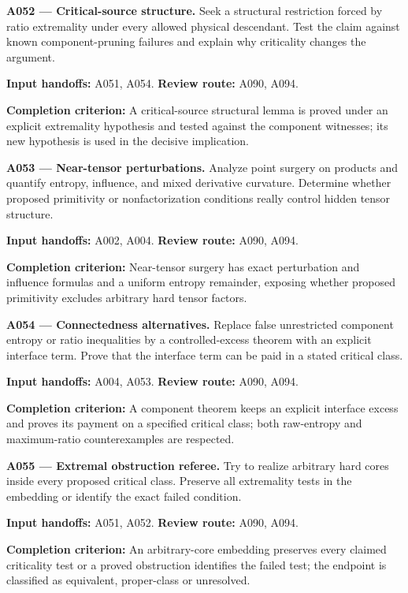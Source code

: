 \documentclass[11pt]{article}
\begin{document}
\textbf{A052 --- Critical-source structure.} Seek a structural restriction forced by ratio extremality under every allowed physical descendant. Test the claim against known component-pruning failures and explain why criticality changes the argument.

{\small\color{ink}\textbf{Input handoffs:} A051, A054. \textbf{Review route:} A090, A094.\par
\textbf{Completion criterion:} A critical-source structural lemma is proved under an explicit extremality hypothesis and tested against the component witnesses; its new hypothesis is used in the decisive implication.\par}



\textbf{A053 --- Near-tensor perturbations.} Analyze point surgery on products and quantify entropy, influence, and mixed derivative curvature. Determine whether proposed primitivity or nonfactorization conditions really control hidden tensor structure.

{\small\color{ink}\textbf{Input handoffs:} A002, A004. \textbf{Review route:} A090, A094.\par
\textbf{Completion criterion:} Near-tensor surgery has exact perturbation and influence formulas and a uniform entropy remainder, exposing whether proposed primitivity excludes arbitrary hard tensor factors.\par}



\textbf{A054 --- Connectedness alternatives.} Replace false unrestricted component entropy or ratio inequalities by a controlled-excess theorem with an explicit interface term. Prove that the interface term can be paid in a stated critical class.

{\small\color{ink}\textbf{Input handoffs:} A004, A053. \textbf{Review route:} A090, A094.\par
\textbf{Completion criterion:} A component theorem keeps an explicit interface excess and proves its payment on a specified critical class; both raw-entropy and maximum-ratio counterexamples are respected.\par}



\textbf{A055 --- Extremal obstruction referee.} Try to realize arbitrary hard cores inside every proposed critical class. Preserve all extremality tests in the embedding or identify the exact failed condition.

{\small\color{ink}\textbf{Input handoffs:} A051, A052. \textbf{Review route:} A090, A094.\par
\textbf{Completion criterion:} An arbitrary-core embedding preserves every claimed criticality test or a proved obstruction identifies the failed test; the endpoint is classified as equivalent, proper-class or unresolved.\par}
\end{document}
